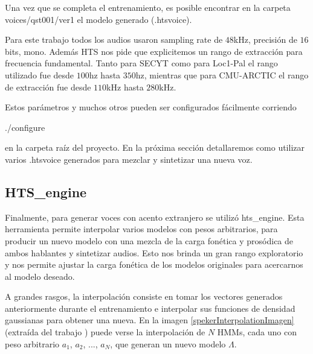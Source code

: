 Una vez que se completa el entrenamiento, es posible encontrar en la carpeta voices/qst001/ver1 el modelo generado (.htsvoice).

Para este trabajo todos los audios usaron sampling rate de $48$kHz, precisión de $16$bits, mono. Además HTS nos pide que explicitemos un rango de extracción para frecuencia fundamental. Tanto para SECYT como para Loc1-Pal el rango utilizado fue desde $100$hz hasta $350$hz, mientras que para CMU-ARCTIC el rango de extracción fue desde $110$kHz hasta $280$kHz.

Estos parámetros y muchos otros pueden ser configurados fácilmente corriendo

\begin{tcolorbox}
./configure
\end{tcolorbox}

\noindent en la carpeta raíz del proyecto. En la próxima sección detallaremos como utilizar varios .htsvoice generados para mezclar y sintetizar una nueva voz.

\subsection{HTS\_engine} \label{interpolationTeory}

Finalmente, para generar voces con acento extranjero se utilizó hts\_engine. Esta herramienta permite interpolar varios modelos con pesos arbitrarios, para producir un nuevo modelo con una mezcla de la carga fonética y prosódica de ambos hablantes y sintetizar audios. Esto nos brinda un gran rango exploratorio y nos permite ajustar la carga fonética de los modelos originales para acercarnos al modelo deseado. 

A grandes rasgos, la interpolación consiste en tomar los vectores generados anteriormente durante el entrenamiento e interpolar sus funciones de densidad gaussianas para obtener una nueva. En la imagen \ref{spekerInterpolationImagen} (extraída del trabajo \cite{SpekerInterpolationRef}) puede verse la interpolación de $N$ HMMs, cada uno con peso arbitrario $a_1$, $a_2$, ..., $a_N$, que generan un nuevo modelo $\Lambda$.


